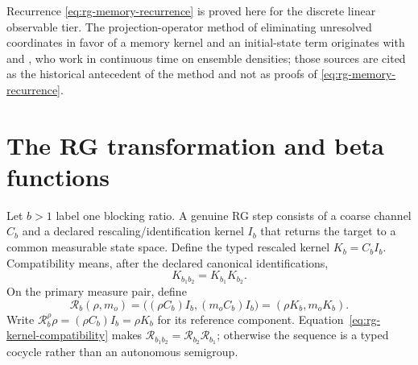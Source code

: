 Recurrence \eqref{eq:rg-memory-recurrence} is proved here for the discrete
linear observable tier.  The projection-operator method of eliminating
unresolved coordinates in favor of a memory kernel and an initial-state term
originates with \citet{Nakajima1958} and \citet{Zwanzig1960}, who work in
continuous time on ensemble densities; those sources are cited as the historical
antecedent of the method and not as proofs of
\eqref{eq:rg-memory-recurrence}. 

\section{The RG transformation and beta functions}
\label{sec:rg-beta-function}

Let $b>1$ label one blocking ratio.  A genuine RG step consists of a coarse
channel $C_b$ and a declared rescaling/identification kernel $I_b$ that returns
the target to a common measurable state space.  Define the typed rescaled
kernel $K_b=C_bI_b$.  Compatibility means, after the declared canonical
identifications,
\begin{equation}
K_{b_1b_2}=K_{b_1}K_{b_2}.
\label{eq:rg-kernel-compatibility}
\end{equation}
On the primary measure pair,
define
\begin{equation}
\mathcal R_b(\rho,m_o)
=\bigl((\rho C_b)I_b,(m_oC_b)I_b\bigr)
=(\rho K_b,m_oK_b).
\label{eq:rg-measure-pair-map}
\end{equation}
Write $\mathcal R_b^\rho\rho=(\rho C_b)I_b=\rho K_b$ for its reference
component.
Equation~\eqref{eq:rg-kernel-compatibility} makes
$\mathcal R_{b_1b_2}=\mathcal R_{b_2}\mathcal R_{b_1}$; otherwise the sequence
is a typed cocycle rather than an autonomous semigroup.  

